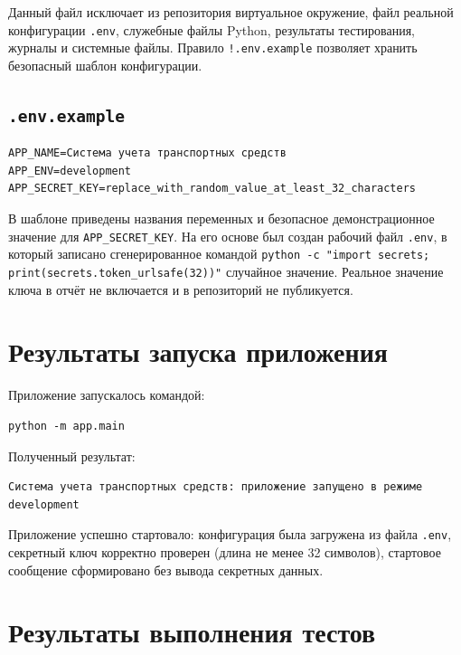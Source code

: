\documentclass[12pt,a4paper]{article}
\begin{document}
Данный файл исключает из репозитория виртуальное окружение, файл реальной конфигурации \texttt{.\allowbreak{}env}, служебные файлы Python, результаты тестирования, журналы и системные файлы. Правило \texttt{!.\allowbreak{}env.\allowbreak{}example} позволяет хранить безопасный шаблон конфигурации.

\subsection{\texttt{.\allowbreak{}env.\allowbreak{}example}}

\begin{lstlisting}
APP_NAME=Система учета транспортных средств
APP_ENV=development
APP_SECRET_KEY=replace_with_random_value_at_least_32_characters
\end{lstlisting}

В шаблоне приведены названия переменных и безопасное демонстрационное значение для \texttt{APP\_SECRET\_KEY}. На его основе был создан рабочий файл \texttt{.\allowbreak{}env}, в который записано сгенерированное командой \texttt{python -c "import secrets; print(secrets.\allowbreak{}token\_urlsafe(32))"} случайное значение. Реальное значение ключа в отчёт не включается и в репозиторий не публикуется.

\section{Результаты запуска приложения}

Приложение запускалось командой:

\begin{lstlisting}
python -m app.main
\end{lstlisting}

Полученный результат:

\begin{lstlisting}
Система учета транспортных средств: приложение запущено в режиме development
\end{lstlisting}

Приложение успешно стартовало: конфигурация была загружена из файла \texttt{.\allowbreak{}env}, секретный ключ корректно проверен (длина не менее 32 символов), стартовое сообщение сформировано без вывода секретных данных.

\section{Результаты выполнения тестов}
\end{document}
